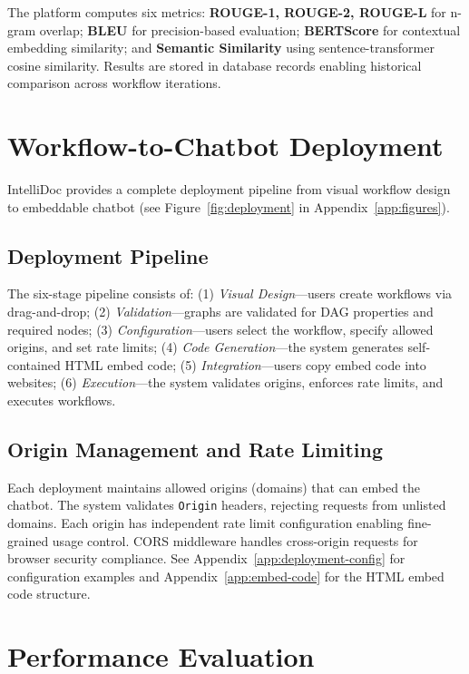 \documentclass[11pt]{article}
\begin{document}
The platform computes six metrics: \textbf{ROUGE-1, ROUGE-2, ROUGE-L} for n-gram overlap; \textbf{BLEU} for precision-based evaluation; \textbf{BERTScore} for contextual embedding similarity; and \textbf{Semantic Similarity} using sentence-transformer cosine similarity. Results are stored in database records enabling historical comparison across workflow iterations.


\section{Workflow-to-Chatbot Deployment}
\label{sec:deployment}

IntelliDoc provides a complete deployment pipeline from visual workflow design to embeddable chatbot (see Figure~\ref{fig:deployment} in Appendix~\ref{app:figures}).

\subsection{Deployment Pipeline}

The six-stage pipeline consists of: (1) \textit{Visual Design}—users create workflows via drag-and-drop; (2) \textit{Validation}—graphs are validated for DAG properties and required nodes; (3) \textit{Configuration}—users select the workflow, specify allowed origins, and set rate limits; (4) \textit{Code Generation}—the system generates self-contained HTML embed code; (5) \textit{Integration}—users copy embed code into websites; (6) \textit{Execution}—the system validates origins, enforces rate limits, and executes workflows.

\subsection{Origin Management and Rate Limiting}

Each deployment maintains allowed origins (domains) that can embed the chatbot. The system validates \texttt{Origin} headers, rejecting requests from unlisted domains. Each origin has independent rate limit configuration enabling fine-grained usage control. CORS middleware handles cross-origin requests for browser security compliance. See Appendix~\ref{app:deployment-config} for configuration examples and Appendix~\ref{app:embed-code} for the HTML embed code structure.


\section{Performance Evaluation}
\label{sec:performance}
\end{document}
